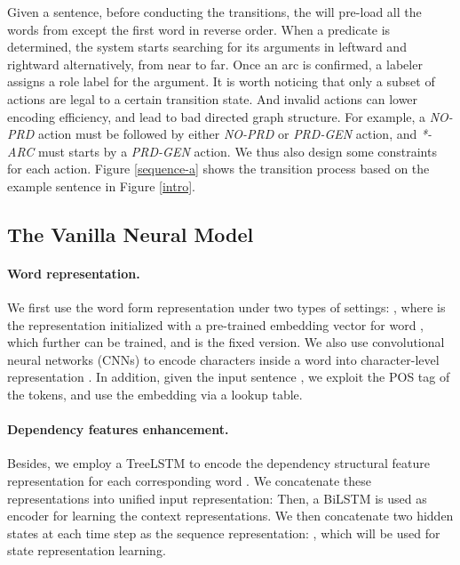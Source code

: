 \documentclass[letterpaper]{article} \usepackage{aaai21}  \usepackage{times}  \usepackage{helvet} \usepackage{courier}  \usepackage[hyphens]{url}  \usepackage{graphicx} \urlstyle{rm} \def\UrlFont{\rm}  \usepackage{natbib}  \usepackage{caption}
\begin{document}
\begin{CJK}{UTF8}{gbsn}
Given a sentence, before conducting the transitions, the  will pre-load all the words from  except the first word in reverse order.
When a predicate is determined, the system starts searching for its arguments in leftward and rightward alternatively, from near to far.
Once an arc is confirmed, a labeler assigns a role label for the argument.
It is worth noticing that only a subset of actions are legal to a certain transition state.
And invalid actions can lower encoding efficiency, and lead to bad directed graph structure.
For example, a \emph{NO-PRD} action must be followed by either \emph{NO-PRD} or \emph{PRD-GEN} action, and \emph{*-ARC} must starts by a \emph{PRD-GEN} action.
We thus also design some constraints for each action.
Figure \ref{sequence-a} shows the transition process based on the example sentence in Figure \ref{intro}.






\subsection{The Vanilla Neural Model}\label{vanilla model}







\paragraph{Word representation.}
We first use the word form representation under two types of settings: ,
where  is the representation initialized with a pre-trained embedding vector for word , which further can be trained, and  is the fixed version.
We also use convolutional neural networks (CNNs) to encode characters inside a word  into character-level representation .
In addition, given the input sentence , we exploit the POS tag of the tokens, and use the embedding  via a lookup table.


\paragraph{Dependency features enhancement.}
Besides, we employ a TreeLSTM \cite{tai-etal-2015-improved,miwa-bansal-2016-end} to encode the dependency structural feature representation  for each corresponding word .
We concatenate these representations into unified input representation: 
Then, a BiLSTM is used as encoder for learning the context representations.
We then concatenate two hidden states at each time step  as the sequence representation: , which will be used for state representation learning.






\end{CJK}
\end{document}
